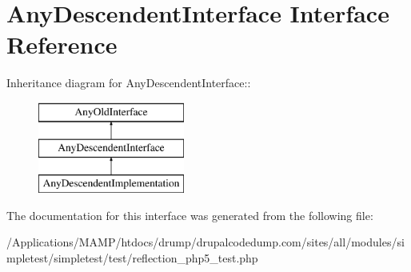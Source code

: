 \hypertarget{interface_any_descendent_interface}{
\section{AnyDescendentInterface Interface Reference}
\label{interface_any_descendent_interface}
}
Inheritance diagram for AnyDescendentInterface::\begin{figure}[H]
\begin{center}
\leavevmode
\includegraphics[height=3cm]{interface_any_descendent_interface}
\end{center}
\end{figure}


The documentation for this interface was generated from the following file:\begin{DoxyCompactItemize}
\item 
/Applications/MAMP/htdocs/drump/drupalcodedump.com/sites/all/modules/simpletest/simpletest/test/reflection\_\-php5\_\-test.php\end{DoxyCompactItemize}
